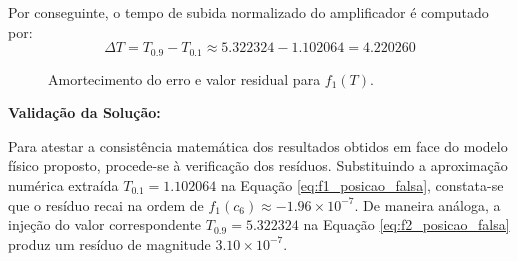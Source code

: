 Por conseguinte, o tempo de subida normalizado do amplificador é computado por:
\begin{equation}
    \Delta T = T_{0.9} - T_{0.1} \approx 5.322324 - 1.102064 = 4.220260
\end{equation}

\begin{figure}[H]
    \centering
    \caption{Amortecimento do erro e valor residual para $f_1(T)$.}
    \label{fig:convergencia_posicao_falsa_amplificador}
\end{figure}

\textbf{Validação da Solução:}

Para atestar a consistência matemática dos resultados obtidos em face do modelo físico proposto, procede-se à verificação dos resíduos. Substituindo a aproximação numérica extraída $T_{0.1} = 1.102064$ na Equação \ref{eq:f1_posicao_falsa}, constata-se que o resíduo recai na ordem de $f_1(c_6) \approx -1.96 \times 10^{-7}$. De maneira análoga, a injeção do valor correspondente $T_{0.9} = 5.322324$ na Equação \ref{eq:f2_posicao_falsa} produz um resíduo de magnitude $3.10 \times 10^{-7}$. 

